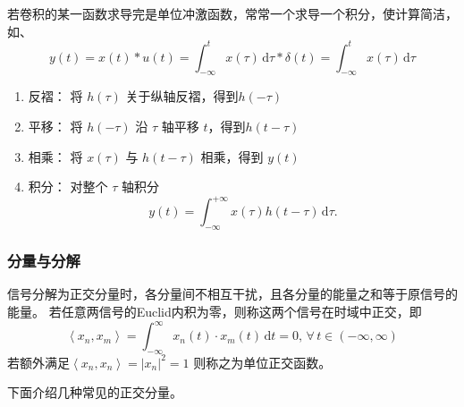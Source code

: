\documentclass[UTF8,fontset=fandol,zihao=5]{ctexart}
\newcommand{\dd}{\,\mathrm{d}}
\begin{document}
\begin{enumerate}
\begin{methodbox}[卷积性质]
\begin{enumerate}[label=\arabic*.]
\begin{itemize}
  \end{itemize}
  若卷积的某一函数求导完是单位冲激函数，常常一个求导一个积分，使计算简洁，如、
  \[
  y(t) = x(t) \ast u(t) = \int_{-\infty}^{t}x(\tau)\dd\tau \ast \delta(t) = \int_{-\infty}^{t}x(\tau)\dd\tau
  \]
\end{enumerate}
    \end{methodbox}
    \begin{methodbox}[【技巧】图解法]
      \begin{enumerate}[label=(\arabic*)]
        \item 反褶： 将 \(h(\tau)\) 关于纵轴反褶，得到\(h(-\tau)\)
      
        \item 平移： 将 \(h(-\tau)\) 沿 \(\tau\) 轴平移 \(t\)，得到\(h(t-\tau)\)
        
        \item 相乘： 将 \(x(\tau)\) 与 \(h(t-\tau)\) 相乘，得到 \(y(t)\)
        
        \item 积分： 对整个 \(\tau\) 轴积分
        \[
        y(t)
        =
        \int_{-\infty}^{+\infty}
        x(\tau)h(t-\tau)\dd\tau.
        \]
      \end{enumerate}
    \end{methodbox}
    
\end{enumerate}

\subsubsection{分量与分解}

  信号分解为正交分量时，各分量间不相互干扰，且各分量的能量之和等于原信号的能量。
  若任意两信号的Euclid内积为零，则称这两个信号在时域中正交，即
  \[
  \left \langle  x_n, x_m \right \rangle  = \int_{-\infty}^{\infty} x_n(t) \cdot x_m(t) \dd t = 0, \, \forall \, t \in \left ( -\infty, \infty\right )
  \]
  若额外满足$\displaystyle \left \langle  x_n, x_n \right \rangle  = \left | x_n \right | ^2 = 1$
  则称之为单位正交函数。

  下面介绍几种常见的正交分量。
\end{document}
